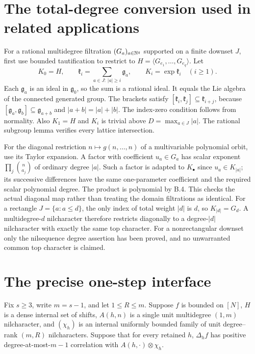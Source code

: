 \documentclass[11pt]{article}
\begin{document}
\section{The total-degree conversion used in related applications}

For a rational multidegree filtration $(G_a)_{a\in\mathbb N^q}$ supported
on a finite downset $J$, first use bounded tautification to restrict
to $H=\langle G_{e_1},\ldots,G_{e_q}\rangle$. Let
\[
 K_0=H,\qquad
 \mathfrak k_i=\sum_{a\in J:\ |a|\geq i}\mathfrak g_a,
 \qquad K_i=\exp\mathfrak k_i\quad(i\geq1).
\]
Each $\mathfrak g_a$ is an ideal in $\mathfrak g_0$, so the sum is
a rational ideal. It equals the Lie algebra of the connected generated
group. The brackets satisfy
$[\mathfrak k_i,\mathfrak k_j]\subseteq\mathfrak k_{i+j}$,
because $[\mathfrak g_a,\mathfrak g_b]\subseteq\mathfrak g_{a+b}$
and $|a+b|=|a|+|b|$. The index-zero condition follows from normality.
Also $K_1=H$ and $K_i$ is trivial above $D=\max_{a\in J}|a|$.
The rational subgroup lemma verifies every lattice intersection.

For the diagonal restriction $n\mapsto g(n,\ldots,n)$ of a
multivariable polynomial orbit, use its Taylor expansion. A factor
with coefficient $u_a\in G_a$ has scalar exponent
$\prod_j\binom n{a_j}$ of ordinary degree $|a|$. Such a factor
is adapted to $K_\bullet$ since $u_a\in K_{|a|}$; its successive
differences have the same one-parameter coefficient and the required
scalar polynomial degree. The product is polynomial by B.4. This
checks the actual diagonal map rather than treating the domain
filtrations as identical. For a rectangle $J=\{a:a\leq d\}$,
the only index of total weight $|d|$ is $d$, so $K_{|d|}=G_d$.
A multidegree-$d$ nilcharacter therefore restricts diagonally to a
degree-$|d|$ nilcharacter with exactly the same top character.
For a nonrectangular downset only the nilsequence degree assertion
has been proved, and no unwarranted common top character is claimed.

\section{The precise one-step interface}

Fix $s\geq3$, write $m=s-1$, and let $1\leq R\leq m$.
Suppose $f$ is bounded on $[N]$, $H$ is a dense internal set of
shifts, $A(h,n)$ is a single unit multidegree $(1,m)$ nilcharacter,
and $(\chi_h)$ is an internal uniformly bounded family of unit
degree--rank $(m,R)$ nilcharacters. Suppose that for every retained
$h$, $\Delta_h f$ has positive degree-at-most-$m-1$ correlation with
$A(h,\cdot)\otimes\chi_h$.
\end{document}
